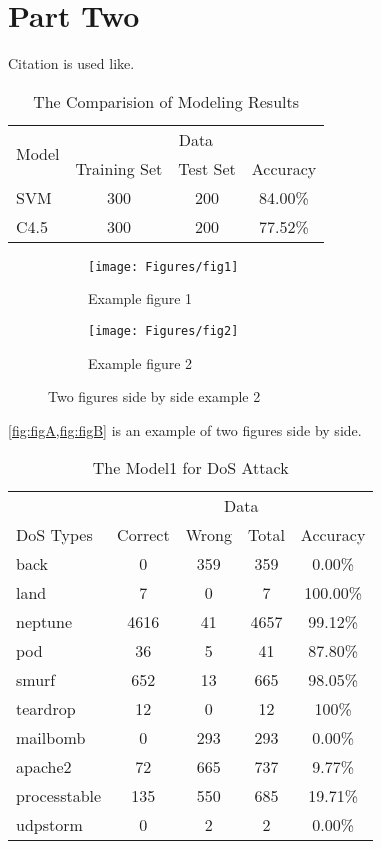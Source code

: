\documentclass[12pt,english, openany]{book}
\begin{document}
	\chapter{Part Two}
	Citation is used like\cite{ex}.
	\begin{table}[b]
		\centering
		\begin{tabular}{lccc}
			\toprule
			\multirow{2}{*}{Model} & \multicolumn{3}{c}{Data} \\ \cmidrule(lr){2-4}
			& Training Set &  Test Set &  Accuracy \\
			\midrule
			SVM & 300 & 200 & 84.00\% \\
			C4.5 & 300 & 200 & 77.52\% \\
			\bottomrule
		\end{tabular}
		\caption{The Comparision of Modeling Results}
		\label{tab-label-2}
	\end{table}
	
	\begin{figure}[h]
		\centering
		\begin{subfigure}{0.49\linewidth} \centering
			\texttt{[image: Figures/fig1]}
			\caption{Example figure 1}\label{fig:figA}
		\end{subfigure}
		\begin{subfigure}{0.49\linewidth} \centering
			\texttt{[image: Figures/fig2]}
			\caption{Example figure 2}\label{fig:figB}
		\end{subfigure}
		\caption{Two figures side by side example 2} \label{fig:twodisturb}
	\end{figure}
	
	\cref{fig:figA,fig:figB} is an example of two figures side by side.
	 
	\begin{table}[h]
		\centering
		\begin{tabular}{lcccc}
			\toprule
			& \multicolumn{4}{c}{Data} \\ \cmidrule(lr){2-5}
			DoS Types & Correct &  Wrong & Total & Accuracy \\
			\midrule
			back & 0 & 359 & 359 & 0.00\% \\
			land & 7 & 0 & 7 & 100.00\% \\
			neptune & 4616 & 41 & 4657 & 99.12\% \\
			pod & 36 & 5 & 41 & 87.80\% \\
			smurf & 652 & 13 & 665 & 98.05\% \\
			teardrop & 12 & 0 & 12 & 100\% \\
			mailbomb & 0 & 293 & 293 & 0.00\% \\
			apache2 & 72 & 665 & 737 & 9.77\% \\
			processtable & 135 & 550 & 685 & 19.71\% \\
			udpstorm & 0 & 2 & 2 & 0.00\% \\
			\bottomrule
		\end{tabular}
		\caption{The Model1 for DoS Attack}
		\label{tab-label}
	\end{table}
	\lipsum[6-9]
	
\end{document}
